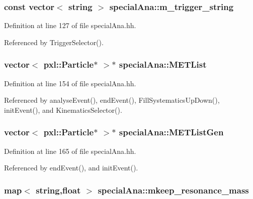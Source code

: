 \subsubsection[{m\-\_\-trigger\-\_\-string}]{\setlength{\rightskip}{0pt plus 5cm}const vector$<$ string $>$ special\-Ana\-::m\-\_\-trigger\-\_\-string}\label{classspecialAna_a4e5b506555aa75a4b132df95398a5ae5}


Definition at line 127 of file special\-Ana.\-hh.



Referenced by Trigger\-Selector().

\subsubsection[{M\-E\-T\-List}]{\setlength{\rightskip}{0pt plus 5cm}vector$<$ pxl\-::\-Particle$\ast$ $>$$\ast$ special\-Ana\-::\-M\-E\-T\-List}\label{classspecialAna_a26e3e78376bd7d09a09d6b2db1152402}


Definition at line 154 of file special\-Ana.\-hh.



Referenced by analyse\-Event(), end\-Event(), Fill\-Systematics\-Up\-Down(), init\-Event(), and Kinematics\-Selector().

\subsubsection[{M\-E\-T\-List\-Gen}]{\setlength{\rightskip}{0pt plus 5cm}vector$<$ pxl\-::\-Particle$\ast$ $>$$\ast$ special\-Ana\-::\-M\-E\-T\-List\-Gen}\label{classspecialAna_a771b064c24368a06e5de930cb48f2d36}


Definition at line 165 of file special\-Ana.\-hh.



Referenced by end\-Event(), and init\-Event().

\subsubsection[{mkeep\-\_\-resonance\-\_\-mass}]{\setlength{\rightskip}{0pt plus 5cm}map$<$ string,float $>$ special\-Ana\-::mkeep\-\_\-resonance\-\_\-mass}\label{classspecialAna_a94f42f297f53448b135d5586055bb7d1}


